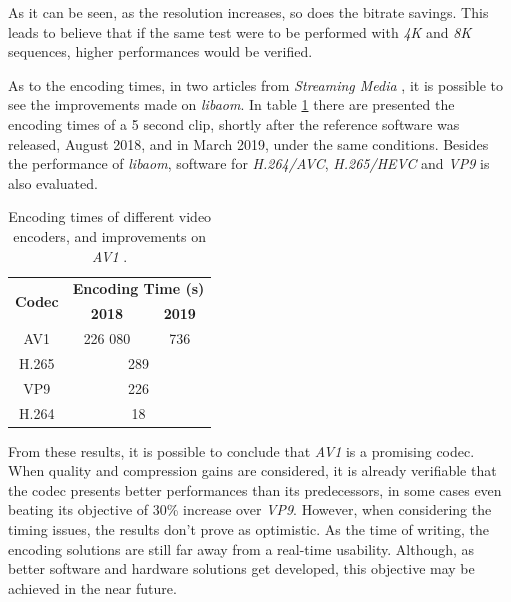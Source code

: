 As it can be seen, as the resolution increases, so does the bitrate savings. This leads to believe that if the same test were to be performed with \emph{4K} and \emph{8K} sequences, higher performances would be verified.

As to the encoding times, in two articles from \emph{Streaming Media} \cite{AV1FirstLook2018, GoodNewsAV12019}, it is possible to see the improvements made on \emph{libaom}. In table \ref{tab:testtime} there are presented the encoding times of a 5 second clip, shortly after the reference software was released, August 2018, and in March 2019, under the same conditions. Besides the performance of \emph{libaom}, software for \emph{H.264/AVC}, \emph{H.265/HEVC} and \emph{VP9} is also evaluated.

\begin{table}[h]
    \centering
    \begin{tabular}{ccc} \toprule
        \multirow{2}{*}{\textbf{Codec}}     &      \multicolumn{2}{c}{\textbf{Encoding Time (s)}} \\
         &    \textbf{2018}  &   \textbf{2019}  \\ \toprule
        AV1            &    226 080        & 736 \\ \hline
        H.265          &    \multicolumn{2}{c}{289} \\ \hline
        VP9            &    \multicolumn{2}{c}{226} \\ \hline
        H.264          &    \multicolumn{2}{c}{18} \\
        \bottomrule
    \end{tabular}
    \caption[Encoding times of different video encoders, and improvements on \emph{AV1}]{Encoding times of different video encoders, and improvements on \emph{AV1} \cite{AV1FirstLook2018, GoodNewsAV12019}.}
    \label{tab:testtime}
\end{table}

From these results, it is possible to conclude that \emph{AV1} is a promising codec. When quality and compression gains are considered, it is already verifiable that the codec presents better performances than its predecessors, in some cases even beating its objective of 30\% increase over \emph{VP9}. However, when considering the timing issues, the results don't prove as optimistic. As the time of writing, the encoding solutions are still far away from a real-time usability. Although, as better software and hardware solutions get developed, this objective may be achieved in the near future.


\clearpage
\printbibliography[heading=subbibliography]
